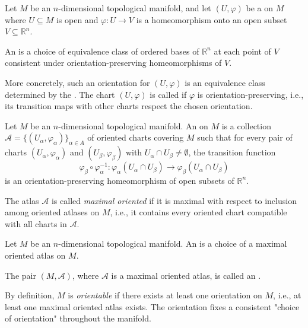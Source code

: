 

\begin{definition} \label{definition:orientation_on_a_topological_manifold}
Let $M$ be an $n$-dimensional topological manifold, and let $(U, \varphi)$ be a  on $M$ where $U \subseteq M$ is open and $\varphi : U \to V$ is a homeomorphism onto an open subset $V \subseteq \mathbb{R}^n$.

An  is a choice of equivalence class of ordered bases of $\mathbb{R}^n$ at each point of $V$ consistent under orientation-preserving homeomorphisms of $V$.

More concretely, such an orientation for $(U, \varphi)$ is an equivalence class determined by the . The chart $(U, \varphi)$ is called  if $\varphi$ is orientation-preserving, i.e., its transition maps with other charts respect the chosen orientation.
\end{definition}

\begin{definition}
Let $M$ be an $n$-dimensional topological manifold. An  on $M$ is a collection $\mathcal{A} = \{ (U_\alpha, \varphi_\alpha) \}_{\alpha \in A}$ of oriented charts covering $M$ such that for every pair of charts $(U_\alpha, \varphi_\alpha)$ and $(U_\beta, \varphi_\beta)$ with $U_\alpha \cap U_\beta \neq \emptyset$, the transition function 
$$
\varphi_\beta \circ \varphi_\alpha^{-1} : \varphi_\alpha(U_\alpha \cap U_\beta) \to \varphi_\beta(U_\alpha \cap U_\beta)
$$
is an orientation-preserving homeomorphism of open subsets of $\mathbb{R}^n$.

The atlas $\mathcal{A}$ is called \emph{maximal oriented} if it is maximal with respect to inclusion among oriented atlases on $M$, i.e., it contains every oriented chart compatible with all charts in $\mathcal{A}$.
\end{definition}

\begin{definition}
Let $M$ be an $n$-dimensional topological manifold. An  is a choice of a maximal oriented atlas on $M$.

The pair $(M, \mathcal{A})$, where $\mathcal{A}$ is a maximal oriented atlas, is called an .

By definition, $M$ is \emph{orientable} if there exists at least one orientation on $M$, i.e., at least one maximal oriented atlas exists. The orientation fixes a consistent "choice of orientation" throughout the manifold.
\end{definition}

